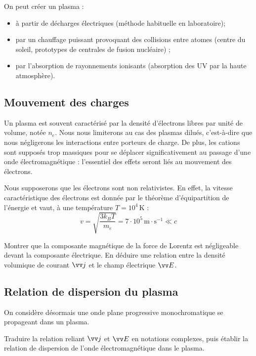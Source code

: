 \documentclass[11pt,fleqn]{book} %
\begin{document}
On peut créer un plasma :
\begin{itemize}
	\item à partir de décharges électriques (méthode habituelle en laboratoire);
	\item par un chauffage puissant provoquant des collisions entre atomes (centre du soleil, prototypes de centrales de fusion nucléaire) ;
	\item par l'absorption de rayonnements ionisants (absorption des UV par la haute atmosphère).
\end{itemize}

\subsection{Mouvement des charges}

Un plasma est souvent caractérisé par la densité d'électrons libres par unité de volume, notée $n_e$. Nous nous limiterons au cas des plasmas dilués, c'est-à-dire que nous négligerons les interactions entre porteurs de charge. De plus, les cations sont supposés trop massiques pour se déplacer significativement au passage d'une onde électromagnétique : l'essentiel des effets seront liés au mouvement des électrons.

Nous supposerons que les électrons sont non relativistes. En effet, la vitesse caractéristique des électrons est donnée par le théorème d'équipartition de l'énergie et vaut, à une température $T = 10^4$\,K :
\begin{equation}
	v = \sqrt{\frac{3 k_B T}{m_e}} = 7 \cdot 10^5\,\mathrm{m}\cdot\mathrm{s}^{-1} \ll c
\end{equation}

\begin{capex}
	Montrer que la composante magnétique de la force de Lorentz est négligeable devant la composante électrique. En déduire une relation entre la densité volumique de courant $\vv j$ et le champ électrique $\vv E$.
\end{capex}

\subsection{Relation de dispersion du plasma}

On considère désormais une onde plane progressive monochromatique se propageant dans un plasma.

\begin{capex}
	Traduire la relation reliant $\vv j$ et $\vv E$ en notations complexes, puis établir la relation de dispersion de l'onde électromagnétique dans le plasma.
\end{capex}
\end{document}

